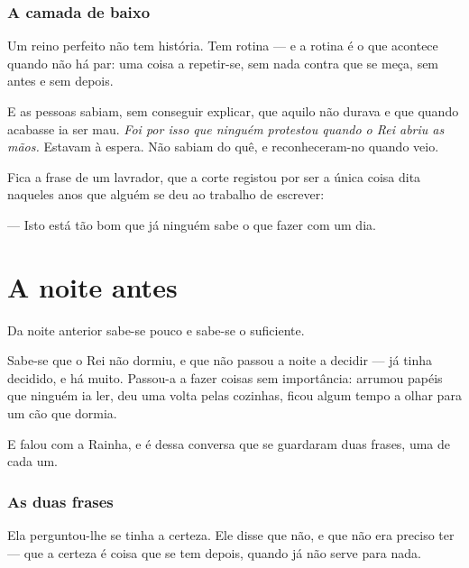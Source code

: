 \documentclass[livro.tex]{subfiles}
\begin{document}
\subsection*{A camada de baixo}

Um reino perfeito não tem história. Tem rotina --- e a rotina é o que acontece quando não há par:
uma coisa a repetir-se, sem nada contra que se meça, sem antes e sem depois.

\medskip

E as pessoas sabiam, sem conseguir explicar, que aquilo não durava e que quando acabasse ia ser
mau. \emph{Foi por isso que ninguém protestou quando o Rei abriu as mãos.} Estavam à espera. Não
sabiam do quê, e reconheceram-no quando veio.

\medskip

Fica a frase de um lavrador, que a corte registou por ser a única coisa dita naqueles anos que
alguém se deu ao trabalho de escrever:

\medskip

--- Isto está tão bom que já ninguém sabe o que fazer com um dia.

\chapter{A noite antes}

Da noite anterior sabe-se pouco e sabe-se o suficiente.

\medskip

Sabe-se que o Rei não dormiu, e que não passou a noite a decidir --- já tinha decidido, e há muito.
Passou-a a fazer coisas sem importância: arrumou papéis que ninguém ia ler, deu uma volta pelas
cozinhas, ficou algum tempo a olhar para um cão que dormia.

\medskip

E falou com a Rainha, e é dessa conversa que se guardaram duas frases, uma de cada um.

\subsection*{As duas frases}

Ela perguntou-lhe se tinha a certeza. Ele disse que não, e que não era preciso ter --- que a
certeza é coisa que se tem depois, quando já não serve para nada.
\end{document}
